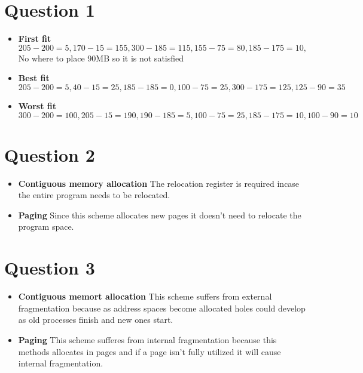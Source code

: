 \documentclass[11pt]{article}
\begin{document}
\maketitle

\section*{Question 1}
\begin{itemize}
    \item \textbf{First fit}
        $205-200=5, 170-15=155, 300-185=115, 155-75=80, 185-175=10, $
        No where to place 90MB so it is not satisfied\\
    \item \textbf{Best fit}
        $205-200=5, 40-15=25, 185-185=0, 100-75=25, 300-175=125, 125-90=35$
    \item \textbf{Worst fit}
        $300-200=100, 205-15=190, 190-185=5, 100-75=25, 185-175=10, 100-90=10$
\end{itemize}
\section*{Question 2}
\begin{itemize}
    \item \textbf{Contiguous memory allocation}
        The relocation register is required incase the entire
        program needs to be relocated.
    \item \textbf{Paging}
        Since this scheme allocates new pages it doesn't need 
        to relocate the program space.
\end{itemize}
\section*{Question 3}
\begin{itemize}
    \item \textbf{Contiguous memort allocation}
        This scheme suffers from external fragmentation because as
        address spaces become allocated holes could develop as old
        processes finish and new ones start.
    \item \textbf{Paging}
        This scheme sufferes from internal fragmentation because
        this methods allocates in pages and if a page isn't fully
        utilized it will cause internal fragmentation.
\end{itemize}
\end{document}
